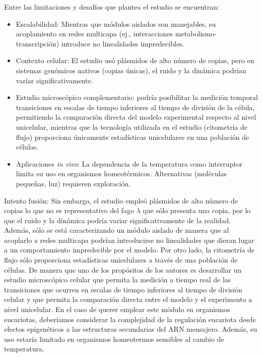 \documentclass[nochap]{config/ejercicios}
\begin{document}
Entre las limitaciones y desafíos que plantea el estudio se encuentran:
\begin{itemize}
    \item Escalabilidad: Mientras que módulos aislados son manejables, su acoplamiento en redes multicapa (ej., interacciones metabolismo-transcripción) introduce no linealidades impredecibles.
    \item Contexto celular: El estudio usó plásmidos de alto número de copias, pero en sistemas genómicos nativos (copias únicas), el ruido y la dinámica podrían variar significativamente.
    \item Estudio microscópico complementario: podría posibilitar la medición temporal transiciones en escalas de tiempo inferiores al tiempo de división de la célula, permitiendo la comparación directa del modelo experimental respecto al nivel unicelular, mientras que la tecnología utilizada en el estudio (citometría de flujo) proporciona únicamente estadísticas unicelulares en una población de células.
    \item Aplicaciones \textit{in vivo}: La dependencia de la temperatura como interruptor limita su uso en organismos homeotérmicos. Alternativas (moléculas pequeñas, luz) requieren exploración.
\end{itemize}

Intento fusión:
Sin embargo, el estudio empleó plásmidos de alto número de copias lo que no es representativo del fago $\lambda$ que sólo presenta una copia, por lo que el ruido y la dinámica podría variar significativamente de la realidad. Además, sólo se está caracterizando un módulo aislado de manera que al acoplarlo a redes multicapa podrían introducirse no linealidades que dieran lugar a un comportamiento impredecible por el modelo. Por otro lado, la citometría de flujo sólo proporciona estadísticas unicelulares a través de una población de células. De manera que uno de los propósitos de los autores es desarrollar un estudio microscópico celular que permita la medición a tiempo real de las transiciones que ocurren en escalas de tiempo inferiores al tiempo de división celular y que permita la comparación directa entre el modelo y el experimento a nivel unicelular. En el caso de querer emplear este módulo en organismos eucariotas, deberíamos considerar la complejidad de la regulación eucariota desde efectos epigenéticos a las estructuras secundarias del ARN mensajero. Además, su uso estaría limitado en organismos homeotermos sensibles al cambio de temperatura.

\end{document}
